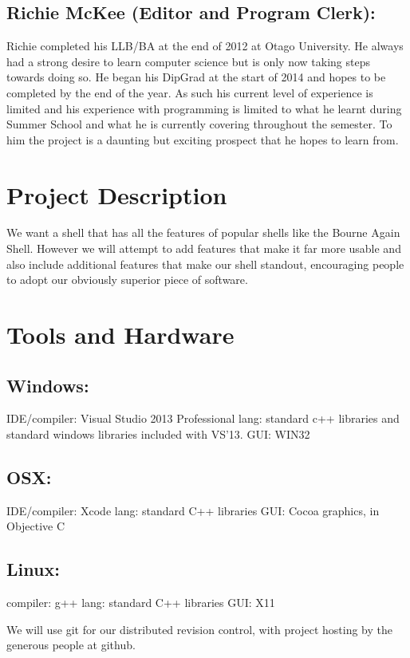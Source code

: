 \documentclass[a4paper,11pt]{article}
\begin{document}
\subsection*{Richie McKee (Editor and Program Clerk):}
Richie completed his LLB/BA at the end of 2012 at Otago University. He always had a strong desire to learn computer science but is only now taking steps towards doing so. He began his DipGrad at the start of 2014 and hopes to be completed by the end of the year. As such his current level of experience is limited and his experience with programming is limited to what he learnt during Summer School and what he is currently covering throughout the semester. To him the project is a daunting but exciting prospect that he hopes to learn from.
\pagebreak
\section{Project Description}

We want a shell that has all the features of popular shells like the Bourne Again Shell. However we will attempt to add features that make it far more usable and also include additional features that make our shell standout, encouraging people to adopt our obviously superior piece of software.

\section{Tools and Hardware}

\subsection*{Windows:}
IDE/compiler: Visual Studio 2013 Professional
lang: standard c++ libraries and standard windows libraries included with VS’13.
GUI: WIN32

\subsection*{OSX:}
IDE/compiler: Xcode
lang: standard C++ libraries
GUI: Cocoa graphics, in Objective C

\subsection*{Linux:}
compiler: g++
lang: standard C++ libraries
GUI: X11

We will use git for our distributed revision control, with project hosting by the generous people at github.
\end{document}
